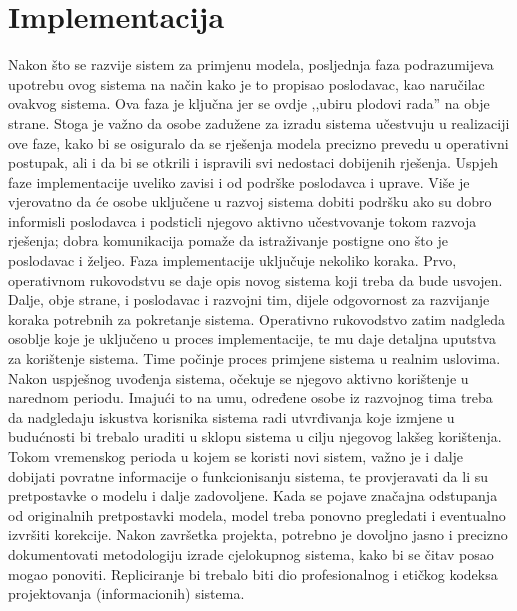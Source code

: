 \documentclass[a4paper, utf8, 11pt, colorlinks]{book}
\theoremstyle{definition}
\begin{document}
\section{Implementacija}

Nakon što se razvije sistem za primjenu modela, posljednja faza  podrazumijeva upotrebu ovog sistema  na način kako je to propisao poslodavac, kao naručilac ovakvog sistema. Ova faza je ključna jer se ovdje ,,ubiru plodovi rada'' na obje strane. Stoga je važno da osobe zadužene za izradu sistema  učestvuju u  realizaciji ove faze, kako bi se osiguralo da se rješenja modela precizno prevedu u operativni postupak, ali i da bi se otkrili i ispravili svi nedostaci dobijenih rješenja. Uspjeh faze implementacije uveliko zavisi i od podrške poslodavca i uprave. Više je vjerovatno da će osobe uključene u razvoj sistema dobiti podršku ako su dobro informisli poslodavca i podsticli njegovo aktivno učestvovanje tokom razvoja rješenja; dobra komunikacija pomaže da istraživanje postigne ono što je poslodavac i željeo.  Faza implementacije uključuje nekoliko koraka. Prvo,  operativnom rukovodstvu se daje opis novog sistema koji treba da bude usvojen. Dalje, obje strane, i poslodavac i razvojni tim, dijele odgovornost za razvijanje koraka potrebnih za pokretanje sistema. Operativno rukovodstvo zatim nadgleda  osoblje koje je uključeno u proces implementacije, te mu daje detaljna uputstva za korištenje sistema. Time počinje proces primjene sistema u realnim uslovima. Nakon uspješnog uvođenja sistema, očekuje se njegovo aktivno korištenje u narednom periodu. Imajući to na umu, određene osobe iz razvojnog tima treba da nadgledaju iskustva korisnika sistema radi utvrđivanja koje izmjene u budućnosti bi trebalo uraditi u sklopu  sistema u cilju njegovog lakšeg korištenja.  Tokom vremenskog perioda u kojem se koristi novi sistem, važno je i dalje dobijati povratne informacije o funkcionisanju sistema, te provjeravati da li su pretpostavke o modelu i dalje zadovoljene. Kada se pojave značajna odstupanja od originalnih pretpostavki modela, model treba ponovno pregledati i eventualno izvršiti korekcije. Nakon završetka projekta, potrebno je   dovoljno jasno i precizno dokumentovati  metodologiju izrade cjelokupnog sistema, kako bi se čitav posao mogao ponoviti. Repliciranje bi trebalo
biti dio profesionalnog i etičkog kodeksa projektovanja (informacionih) sistema. %
\end{document}
